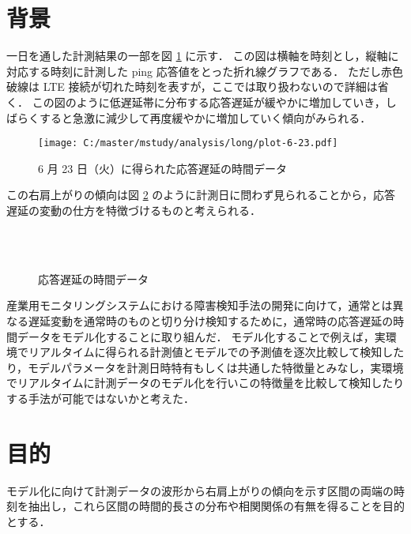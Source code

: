 \documentclass[a4j]{jarticle}
\begin{document}
\section{背景}
一日を通した計測結果の一部を図 \ref{rise} に示す．
この図は横軸を時刻とし，縦軸に対応する時刻に計測した ping 応答値をとった折れ線グラフである．
ただし赤色破線は LTE 接続が切れた時刻を表すが，ここでは取り扱わないので詳細は省く．
この図のように低遅延帯に分布する応答遅延が緩やかに増加していき，しばらくすると急激に減少して再度緩やかに増加していく傾向がみられる．
\begin{figure}[tb]
\begin{center}
\texttt{[image: C:/master/mstudy/analysis/long/plot-6-23.pdf]}
\caption{6 月 23 日（火）に得られた応答遅延の時間データ}
\label{rise}
\end{center}
\end{figure}
この右肩上がりの傾向は図 \ref{otherrise} のように計測日に問わず見られることから，応答遅延の変動の仕方を特徴づけるものと考えられる．
\begin{figure}[tb]
\begin{center}
~
\\
~
\caption{応答遅延の時間データ}
\label{otherrise}
\end{center}
\end{figure}

産業用モニタリングシステムにおける障害検知手法の開発に向けて，通常とは異なる遅延変動を通常時のものと切り分け検知するために，通常時の応答遅延の時間データをモデル化することに取り組んだ．
モデル化することで例えば，実環境でリアルタイムに得られる計測値とモデルでの予測値を逐次比較して検知したり，モデルパラメータを計測日時特有もしくは共通した特徴量とみなし，実環境でリアルタイムに計測データのモデル化を行いこの特徴量を比較して検知したりする手法が可能ではないかと考えた．

\section{目的}
モデル化に向けて計測データの波形から右肩上がりの傾向を示す区間の両端の時刻を抽出し，これら区間の時間的長さの分布や相関関係の有無を得ることを目的とする．
\end{document}
